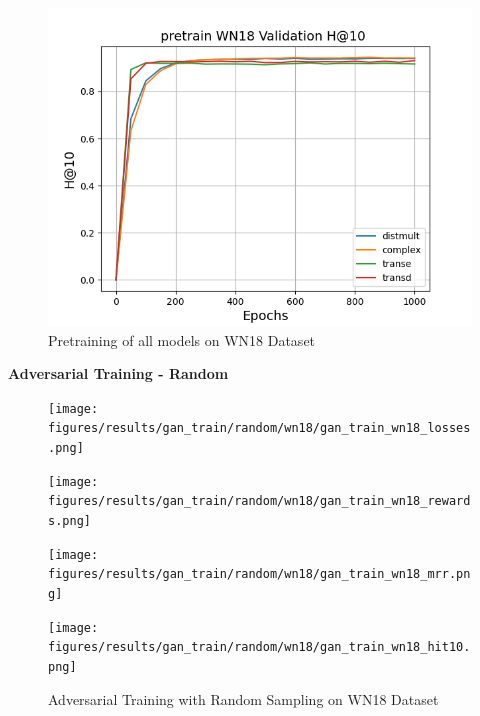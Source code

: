 \begin{figure}
\begin{minipage}{.3\textwidth}
      \centering
      \includegraphics[width=0.9\linewidth]{figures/results/pretrain/wn18/pretrain_wn18_hit10s.png}
    \end{minipage}%
    \caption{Pretraining of all models on \textsc{WN18} Dataset}
    \label{fig:test}
\end{figure}

\pagebreak

\textbf{Adversarial Training - Random}\\
\begin{figure}
    \centering
    \begin{minipage}{.5\textwidth}
      \centering
      \texttt{[image: figures/results/gan\_train/random/wn18/gan\_train\_wn18\_losses.png]}
    \end{minipage}%
    \begin{minipage}{.5\textwidth}
      \centering
      \texttt{[image: figures/results/gan\_train/random/wn18/gan\_train\_wn18\_rewards.png]}
    \end{minipage}
    \begin{minipage}{.5\textwidth}
      \centering
      \texttt{[image: figures/results/gan\_train/random/wn18/gan\_train\_wn18\_mrr.png]}
    \end{minipage}%
    \begin{minipage}{.5\textwidth}
      \centering
      \texttt{[image: figures/results/gan\_train/random/wn18/gan\_train\_wn18\_hit10.png]}
    \end{minipage}%
    \caption{Adversarial Training with Random Sampling on \textsc{WN18} Dataset}
    \label{fig:test}
\end{figure}

\pagebreak